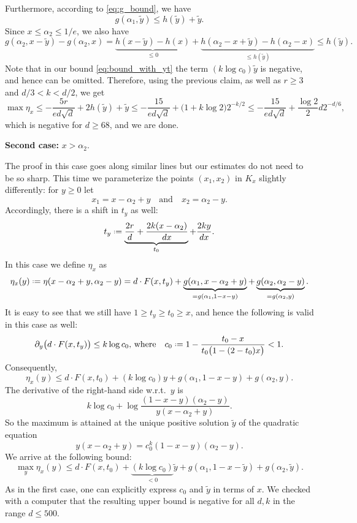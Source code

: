 \documentclass[12pt]{amsart}
\theoremstyle{definition}
\newcommand\yt{\widetilde{y}}
\newcommand\al{\alpha}
\newcommand{\defeq}{\mathrel{\vcenter{\baselineskip0.5ex \lineskiplimit0pt
                     \hbox{\scriptsize.}\hbox{\scriptsize.}}}%
                     =}
\begin{document}
Furthermore, according to \eqref{eq:g_bound}, we have 
%
\[ g(\al_1,\yt) \leq h(\yt) + \yt .\]
%
Since $x \leq \al_2 \leq 1/e$, we also have 
%
\[ g(\al_2,x-\yt) - g(\al_2,x) =
\underbrace{h(x-\yt)-h(x)}_{\leq 0} + 
\underbrace{h(\al_2-x+\yt)-h(\al_2-x)}_{\leq h(\yt)} 
\leq h(\yt) .\]
%
Note that in our bound \eqref{eq:bound_with_yt} the term $(k \log c_0) \yt$ is negative, and hence can be omitted. Therefore, using the previous claim, as well as $r \geq 3$ and $d/3 < k < d/2$, we get  
%
\[\max \eta_x 
\leq - \frac{5r}{e d\sqrt{d}} + 2h(\yt) + \yt 
\leq - \frac{15}{e d\sqrt{d}} 
+ \big(1+ k \log 2 \big) 2^{-k/2} 
\leq - \frac{15}{e d\sqrt{d}} + \frac{\log 2}{2} d2^{-d/6} ,\]
%
which is negative for $d \geq 68$, and we are done.

\medskip

\noindent\textbf{Second case:} $x > \al_2$. 

The proof in this case goes along similar lines but our estimates do not need to be so sharp. This time we parameterize the points $(x_1,x_2)$ in $K_x$ slightly differently: for $y \geq 0$ let 
%
\[ x_1=x-\al_2+y 
\quad \text{and} \quad 
x_2=\al_2-y .\]
%
Accordingly, there is a shift in $t_y$ as well:
%
\[ t_y \defeq 
\underbrace{\frac{2r}{d}+\frac{2k(x-\al_2)}{dx}}_{t_0} + \frac{2k y}{dx} .\]
%
In this case we define $\eta_x$ as
%
\[ \eta_x(y) \defeq \eta(x-\al_2+y,\al_2-y) = 
d \cdot F(x,t_y )+
\underbrace{g(\al_1,x-\al_2+y)}_{=g(\al_1,1-x-y)}+
\underbrace{g(\al_2,\al_2-y)}_{=g(\al_2,y)} .\]
%
It is easy to see that we still have $1 \geq t_y \geq t_0 \geq x$, and hence the following is valid in this case as well:
\[ \partial_y \big( d \cdot F(x,t_y) \big) 
\leq k \log c_0 
\text{, where} \quad 
c_0 \defeq 1-\frac{t_0-x}{t_0 \big( 1-(2-t_0)x \big)} < 1 .\]
%
Consequently, 
%
\[ \eta_x(y) \leq d \cdot F(x,t_0) + 
(k \log c_0 ) y + g(\al_1,1-x-y) + g(\al_2,y) .\]
%
The derivative of the right-hand side w.r.t.~$y$ is 
%
\[ k \log c_0 
+ \log \frac{(1-x-y)(\al_2-y)}{y(x-\al_2+y)} .\]
%
So the maximum is attained at the unique positive solution $\yt$ of the quadratic equation 
%
\[ y(x-\al_2+y) = c_0^k (1-x-y)(\al_2-y) .\]
%
We arrive at the following bound:
%
\begin{equation} \label{eq:bound_case2}
\max_{y} \eta_x(y) \leq d \cdot F(x,t_0) + 
\underbrace{(k \log c_0 )}_{<0} \yt + g(\al_1,1-x-\yt) + g(\al_2,\yt) .
\end{equation}
%
As in the first case, one can explicitly express $c_0$ and $\yt$ in terms of $x$. We checked with a computer that the resulting upper bound is negative for all $d,k$ in the range $d \leq 500$.
\end{document}
